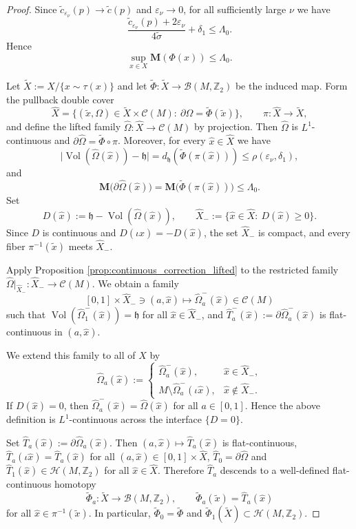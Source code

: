 \documentclass[12pt,english]{article}
\theoremstyle{definition}
\begin{document}
\begin{proof}
Since $\tilde c_{\varepsilon_\nu}(p)\to \tilde c(p)$ and $\varepsilon_\nu\to 0$, for all sufficiently large $\nu$ we have
\[
\frac{\tilde c_{\varepsilon_\nu}(p)+2\varepsilon_\nu}{4\tilde\sigma}+\delta_1
\le \Lambda_0.
\]
Hence
\[
\sup_{x\in X}\mathbf M(\Phi(x))\le \Lambda_0.
\]

Let $\tilde X:=X/\{x\sim \tau(x)\}$ and let $\tilde\Phi:\tilde X\to \mathcal B(M,\mathbb{Z}_2)$ be the induced map.
Form the pullback double cover
\[
\widehat X=\{(\tilde x,\Omega)\in \tilde X\times \mathcal C(M):\ \partial\Omega=\tilde\Phi(\tilde x)\},
\qquad \pi:\widehat X\to \tilde X,
\]
and define the lifted family $\widehat\Omega:\widehat X\to \mathcal C(M)$ by projection.
Then $\widehat\Omega$ is $L^1$-continuous and $\partial\widehat\Omega=\tilde\Phi\circ\pi$. Moreover, for every $\hat x\in\widehat X$ we have
\[
\bigl|\operatorname{Vol}(\widehat\Omega(\hat x))-\mathfrak h\bigr|=d_{\mathfrak h}(\tilde\Phi(\pi(\hat x)))
\le \rho(\varepsilon_\nu,\delta_1),
\]
and
\[
\mathbf M\bigl(\partial\widehat\Omega(\hat x)\bigr)
=\mathbf M\bigl(\tilde\Phi(\pi(\hat x))\bigr)\le \Lambda_0.
\]
Set
\[
D(\hat x):=\mathfrak h-\operatorname{Vol}(\widehat\Omega(\hat x)),
\qquad
\widehat X_-:=\{\hat x\in \widehat X:\ D(\hat x)\ge 0\}.
\]
Since $D$ is continuous and $D(\iota\hat x)=-D(\hat x)$, the set $\widehat X_-$ is compact, and every fiber $\pi^{-1}(\tilde x)$ meets $\widehat X_-$.

Apply Proposition \ref{prop:continuous_correction_lifted} to the restricted family $\widehat\Omega|_{\widehat X_-}:\widehat X_-\to \mathcal C(M)$. We obtain a family
\[
[0,1]\times \widehat X_- \ni (a,\hat x)\longmapsto \widehat\Omega_a^-(\hat x)\in \mathcal C(M)
\]
such that $\operatorname{Vol}(\widehat\Omega_1^-(\hat x))=\mathfrak h$
for all $\hat x\in \widehat X_-$, and $\widehat T_a^-(\hat x):=\partial\widehat\Omega_a^-(\hat x)$ is flat-continuous in $(a,\hat x)$.

We extend this family to all of $\widehat X$ by
\[
\widehat\Omega_a(\hat x):=
\begin{cases}
\widehat\Omega_a^-(\hat x), & \hat x\in \widehat X_-,\\[1ex]
M\setminus \widehat\Omega_a^-(\iota\hat x), & \hat x\notin \widehat X_-.
\end{cases}
\]
If $D(\hat x)=0$, then $\widehat\Omega_a^-(\hat x)=\widehat\Omega(\hat x)$ for all $a\in[0,1]$.
Hence the above definition is $L^1$-continuous across the interface $\{D=0\}$.

Set $\widehat T_a(\hat x):=\partial\widehat\Omega_a(\hat x)$. Then $(a,\hat x)\mapsto \widehat T_a(\hat x)$ is flat-continuous, $
\widehat T_a(\iota\hat x)=\widehat T_a(\hat x)$ for all $(a,\hat x)\in [0,1]\times \widehat X$, $\widehat T_0=\partial\widehat\Omega$ and $\widehat T_1(\hat x)\in \mathcal H(M,\mathbb{Z}_2)$ for all $\hat x\in \widehat X$.
Therefore $\widehat T_a$ descends to a well-defined flat-continuous homotopy
\[
\tilde\Phi_a:\tilde X\to \mathcal B(M,\mathbb{Z}_2),
\qquad
\tilde\Phi_a(\tilde x)=\widehat T_a(\hat x)
\]
for all $\hat x\in\pi^{-1}(\tilde x)$. In particular, $\tilde\Phi_0=\tilde\Phi$ and $\tilde\Phi_1(\tilde X)\subset \mathcal H(M,\mathbb{Z}_2)$.


\end{proof}
\end{document}
